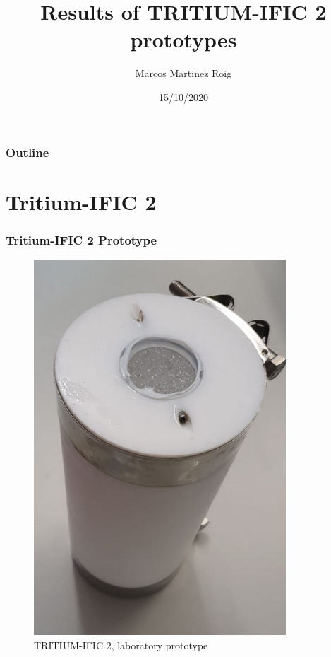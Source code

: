 \documentclass{beamer}
\title[TRITIUM-IFIC 2]{Results of TRITIUM-IFIC 2 prototypes}
\author[M. Martinez-Roig]{Marcos Martinez Roig}
\institute[IFIC]{Instituto de Física Corpuscular, Valencia, España}
\date[15/10/2020]{15/10/2020}
\begin{document}
\begin{frame}
\titlepage
\end{frame}

\begin{frame}
\frametitle{Outline}
\tableofcontents
\end{frame}

\section{Tritium-IFIC 2}
\begin{frame}
\frametitle{Tritium-IFIC 2 Prototype}

\begin{multicols}{2}

\begin{figure}[hbtp]
\centering
\includegraphics[scale=0.3]{Imagenes/1Tritium_detector/Tritium_Lab_Prototype.png}
\caption{TRITIUM-IFIC 2, laboratory prototype}
\end{figure}

\columnbreak


\end{multicols}
\end{frame}
\end{document}
